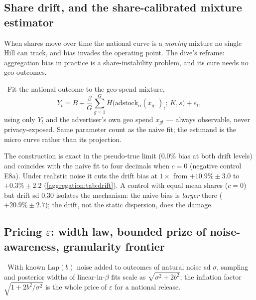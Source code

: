 \subsection{Share drift, and the share-calibrated mixture estimator}

When shares move over time the national curve is a \emph{moving} mixture no single Hill can track, and bias invades the operating point. The dive's reframe: aggregation bias in practice is a share-instability problem, and its cure needs no geo outcomes.

\begin{construction}\label{aggregation:con:mixture}
\tagEstablished\ Fit the national outcome to the geo-spend mixture,
\begin{equation}
Y_t = B + \frac{\beta}{G}\sum_{g=1}^{G} H\bigl(\mathrm{adstock}_\alpha(x_{g\cdot})_t;\, K, s\bigr) + e_t,
\label{eq:aggregation:mixture}
\end{equation}
using only $Y_t$ and the advertiser's own geo spend $x_{gt}$ --- always observable, never privacy-exposed. Same parameter count as the naive fit; the estimand is the micro curve rather than its projection.
\end{construction}

The construction is exact in the pseudo-true limit ($0.0\%$ bias at both drift levels) and coincides with the naive fit to four decimals when $c = 0$ (negative control E8a). Under realistic noise it cuts the drift bias at $1\times$ from $+10.9\% \pm 3.0$ to $+0.3\% \pm 2.2$ (\cref{aggregation:tab:drift}). A control with equal mean shares ($c = 0$) but drift sd $0.30$ isolates the mechanism: the naive bias is \emph{larger} there ($+20.9\% \pm 2.7$); the drift, not the static dispersion, does the damage.

\subsection{Pricing $\varepsilon$: width law, bounded prize of noise-awareness, granularity frontier}

\begin{law}\label{aggregation:law:width}
\tagEstablished\ With known $\mathrm{Lap}(b)$ noise added to outcomes of natural noise sd $\sigma$, sampling and posterior widths of linear-in-$\beta$ fits scale as $\sqrt{\sigma^2 + 2b^2}$; the inflation factor $\sqrt{1 + 2b^2/\sigma^2}$ is the whole price of $\varepsilon$ for a national release.
\end{law}

